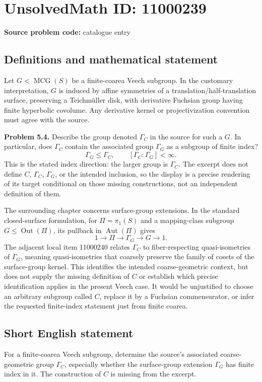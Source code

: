 \documentclass[11pt]{article}
\begin{document}
\section*{UnsolvedMath ID: 11000239}
\textbf{Source problem code:} catalogue entry
\subsection{Definitions and mathematical statement}
Let $G<\operatorname{MCG}(S)$ be a finite-coarea Veech subgroup. In the customary interpretation, $G$ is induced by affine symmetries of a translation/half-translation surface, preserving a Teichm\"uller disk, with derivative Fuchsian group having finite hyperbolic covolume. Any derivative kernel or projectivization convention must agree with the source.

\textbf{Problem 5.4.} Describe the group denoted $\Gamma_C$ in the source for such a $G$. In particular, does $\Gamma_C$ contain the associated group $\Gamma_G$ as a subgroup of finite index?
\[
 \Gamma_G\le\Gamma_C,\qquad [\Gamma_C:\Gamma_G]<\infty.
\]
This is the stated index direction: the larger group is $\Gamma_C$. The excerpt does not define $C$, $\Gamma_C$, $\Gamma_G$, or the intended inclusion, so the display is a precise rendering of its target conditional on those missing constructions, not an independent definition of them.

The surrounding chapter concerns surface-group extensions. In the standard closed-surface formulation, for $\Pi=\pi_1(S)$ and a mapping-class subgroup $G\le\operatorname{Out}(\Pi)$, its pullback in $\operatorname{Aut}(\Pi)$ gives
\[
 1\longrightarrow\Pi\longrightarrow\Gamma_G\longrightarrow G\longrightarrow1.
\]
The adjacent local item 11000240 relates $\Gamma_C$ to fiber-respecting quasi-isometries of $\Gamma_G$, meaning quasi-isometries that coarsely preserve the family of cosets of the surface-group kernel. This identifies the intended coarse-geometric context, but does not supply the missing definition of $C$ or establish which precise identification applies in the present Veech case. It would be unjustified to choose an arbitrary subgroup called $C$, replace it by a Fuchsian commensurator, or infer the requested finite-index statement just from finite coarea.
\subsection{Short English statement}
For a finite-coarea Veech subgroup, determine the source's associated coarse-geometric group $\Gamma_C$, especially whether the surface-group extension $\Gamma_G$ has finite index in it. The construction of $C$ is missing from the excerpt.
\end{document}
